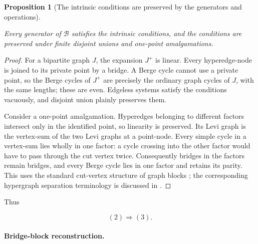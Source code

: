 \documentclass[a4paper,11pt,reqno]{amsart}
\theoremstyle{plain}
\newtheorem{proposition}[theorem]{Proposition}
\theoremstyle{definition}
\theoremstyle{remark}
\begin{document}
\begin{proposition}[The intrinsic conditions are preserved by the generators and operations]\label{proposition-5.1-the-intrinsic-conditions-are-preserved-by-the-generators-and-operations}

Every generator of \(\mathcal B\) satisfies the intrinsic conditions, and the conditions are preserved under finite disjoint unions and one-point amalgamations.

\end{proposition}
\begin{proof}
For a bipartite graph \(J\), the expansion \(J^+\) is linear. Every hyperedge-node is joined to its private point by a bridge. A Berge cycle cannot use a private point, so the Berge cycles of \(J^+\) are precisely the ordinary graph cycles of \(J\), with the same lengths; these are even. Edgeless systems satisfy the conditions vacuously, and disjoint union plainly preserves them.

Consider a one-point amalgamation. Hyperedges belonging to different factors intersect only in the identified point, so linearity is preserved. Its Levi graph is the vertex-sum of the two Levi graphs at a point-node. Every simple cycle in a vertex-sum lies wholly in one factor: a cycle crossing into the other factor would have to pass through the cut vertex twice. Consequently bridges in the factors remain bridges, and every Berge cycle lies in one factor and retains its parity. This uses the standard cut-vertex structure of graph blocks \citep[Chapter~3]{diestel2017}; the corresponding hypergraph separation terminology is discussed in \citet{bahmanian2015}.
\end{proof}

Thus

\[
(2)\Longrightarrow(3). \tag{5.1}
\]

\paragraph{Bridge-block reconstruction.}\label{bridge-block-reconstruction}
\end{document}
